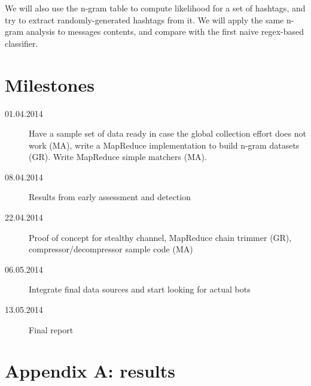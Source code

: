 \documentclass[a4paper,11pt]{article}
\begin{document}
We will also use the n-gram table to compute likelihood for a set of hashtags, and try to extract randomly-generated hashtags from it. We will apply the same n-gram analysis to messages contents, and compare with the first naive regex-based classifier.

\section{Milestones}

\begin{description}
	\item[01.04.2014] Have a sample set of data ready in case the global collection effort does not work (MA), write a MapReduce implementation to build n-gram datasets (GR). Write MapReduce simple matchers (MA).
	\item[08.04.2014] Results from early assessment and detection
	\item[22.04.2014] Proof of concept for stealthy channel, MapReduce chain trimmer (GR), compressor/decompressor sample code (MA)
	\item[06.05.2014] Integrate final data sources and start looking for actual bots
	\item[13.05.2014] Final report 
\end{description}

\appendix

\section{Appendix A: results}
\end{document}
